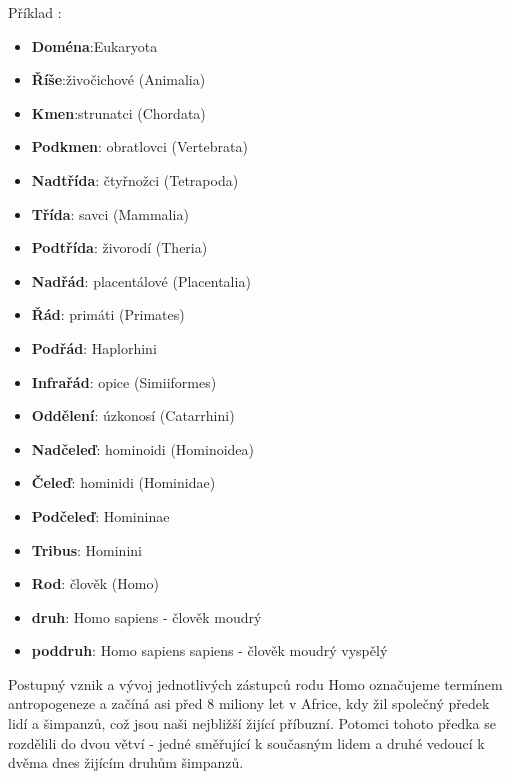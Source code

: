         \begin{tcnote}
          Příklad \wikiKlasCloveka:
          \begin{itemize}[noitemsep]
            \item \textbf{Doména}:Eukaryota
            \item \textbf{Říše}:živočichové (Animalia)
            \item \textbf{Kmen}:strunatci (Chordata)
            \item \textbf{Podkmen}:	obratlovci (Vertebrata)
            \item \textbf{Nadtřída}: čtyřnožci (Tetrapoda)
            \item \textbf{Třída}:	savci (Mammalia)
            \item \textbf{Podtřída}: živorodí (Theria)
            \item \textbf{Nadřád}: placentálové (Placentalia)
            \item \textbf{Řád}:	primáti (Primates)
            \item \textbf{Podřád}: Haplorhini
            \item \textbf{Infrařád}: opice (Simiiformes)
            \item \textbf{Oddělení}: úzkonosí (Catarrhini)
            \item \textbf{Nadčeleď}: hominoidi (Hominoidea)
            \item \textbf{Čeleď}:	hominidi (Hominidae)
            \item \textbf{Podčeleď}: Homininae
            \item \textbf{Tribus}: Hominini
            \item \textbf{Rod}:	člověk (Homo)
            \item \textbf{druh}: Homo sapiens - člověk moudrý
            \item \textbf{poddruh}: Homo sapiens sapiens - člověk moudrý vyspělý
          \end{itemize}
          \tcblower
          Postupný vznik a vývoj jednotlivých zástupců rodu Homo označujeme termínem antropogeneze a
          začíná asi před 8 miliony let v Africe, kdy žil společný předek lidí a šimpanzů, což jsou
          naši nejbližší žijící příbuzní. Potomci tohoto předka se rozdělili do dvou větví - jedné
          směřující k současným lidem a druhé vedoucí k dvěma dnes žijícím druhům šimpanzů.

          \vspace{1em}
          {\centering
          \captionsetup{type=figure} 
          \label{fyz:fig0953}
        \par}

        \end{tcnote}

